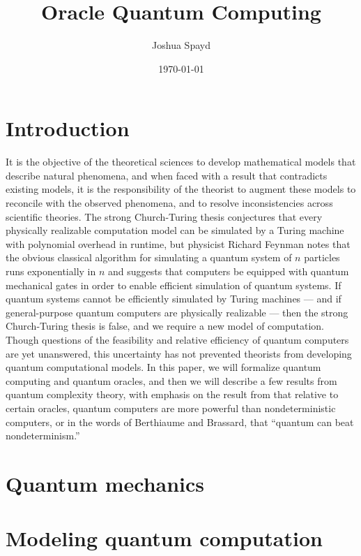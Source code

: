 \documentclass[12pt]{article}
\title{Oracle Quantum Computing}
\author{Joshua Spayd}
\date{\today}
\begin{document}
\maketitle

\section{Introduction}
It is the objective of the theoretical sciences to develop mathematical models
that describe natural phenomena, and when faced with a result that contradicts
existing models, it is the responsibility of the theorist to augment these
models to reconcile with the observed phenomena, and to resolve
inconsistencies across scientific theories. The strong Church-Turing thesis
conjectures that every physically realizable computation model can be
simulated by a Turing machine with polynomial overhead in runtime, but
physicist Richard Feynman \cite{Fey82} notes that the obvious classical
algorithm for simulating a quantum system of $n$ particles runs exponentially
in $n$ and suggests that computers be equipped with quantum mechanical gates
in order to enable efficient simulation of quantum systems. If quantum systems
cannot be efficiently simulated by Turing machines --- and if general-purpose
quantum computers are physically realizable --- then the strong Church-Turing
thesis is false, and we require a new model of computation. Though questions
of the feasibility and relative efficiency of quantum computers are yet
unanswered, this uncertainty has not prevented theorists from developing
quantum computational models. In this paper, we will formalize quantum computing
and quantum oracles, and then we will describe a few results from quantum
complexity theory, with emphasis on the result from \cite{BB92} that relative to
certain oracles, quantum computers are more powerful than nondeterministic
computers, or in the words of  Berthiaume and Brassard, that ``quantum can beat
nondeterminism.''


\section{Quantum mechanics}



\section{Modeling quantum computation}

\end{document}
